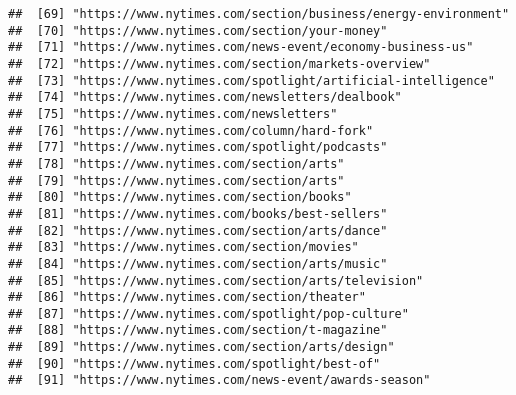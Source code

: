 \documentclass[
]{article}
\begin{document}
\begin{verbatim}
##  [69] "https://www.nytimes.com/section/business/energy-environment"                                               
##  [70] "https://www.nytimes.com/section/your-money"                                                                
##  [71] "https://www.nytimes.com/news-event/economy-business-us"                                                    
##  [72] "https://www.nytimes.com/section/markets-overview"                                                          
##  [73] "https://www.nytimes.com/spotlight/artificial-intelligence"                                                 
##  [74] "https://www.nytimes.com/newsletters/dealbook"                                                              
##  [75] "https://www.nytimes.com/newsletters"                                                                       
##  [76] "https://www.nytimes.com/column/hard-fork"                                                                  
##  [77] "https://www.nytimes.com/spotlight/podcasts"                                                                
##  [78] "https://www.nytimes.com/section/arts"                                                                      
##  [79] "https://www.nytimes.com/section/arts"                                                                      
##  [80] "https://www.nytimes.com/section/books"                                                                     
##  [81] "https://www.nytimes.com/books/best-sellers"                                                                
##  [82] "https://www.nytimes.com/section/arts/dance"                                                                
##  [83] "https://www.nytimes.com/section/movies"                                                                    
##  [84] "https://www.nytimes.com/section/arts/music"                                                                
##  [85] "https://www.nytimes.com/section/arts/television"                                                           
##  [86] "https://www.nytimes.com/section/theater"                                                                   
##  [87] "https://www.nytimes.com/spotlight/pop-culture"                                                             
##  [88] "https://www.nytimes.com/section/t-magazine"                                                                
##  [89] "https://www.nytimes.com/section/arts/design"                                                               
##  [90] "https://www.nytimes.com/spotlight/best-of"                                                                 
##  [91] "https://www.nytimes.com/news-event/awards-season"                                                          

\end{verbatim}
\end{document}
